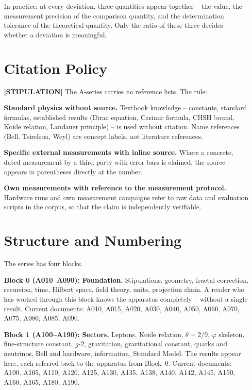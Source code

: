 In practice: at every deviation, three quantities appear together -- the
value, the measurement precision of the comparison quantity, and the
determination tolerance of the theoretical quantity. Only the ratio of these
three decides whether a deviation is meaningful.

\section{Citation Policy}

\textbf{[STIPULATION]} The A-series carries no reference lists. The rule:

\textbf{Standard physics without source.} Textbook knowledge -- constants,
standard formulas, established results (Dirac equation, Casimir formula,
CHSH bound, Koide relation, Landauer principle) -- is used without citation.
Name references (Bell, Tsirelson, Weyl) are concept labels, not literature
references.

\textbf{Specific external measurements with inline source.} Where a concrete,
dated measurement by a third party with error bars is claimed, the source
appears in parentheses directly at the number.

\textbf{Own measurements with reference to the measurement protocol.}
Hardware runs and own measurement campaigns refer to raw data and evaluation
scripts in the corpus, so that the claim is independently verifiable.

\section{Structure and Numbering}

The series has four blocks.

\textbf{Block 0 (A010--A090): Foundation.} Stipulations, geometry, fractal
correction, recursion, time, Hilbert space, field theory, units, projection
chain. A reader who has worked through this block knows the apparatus
completely -- without a single result. Current documents: A010, A015, A020,
A030, A040, A050, A060, A070, A075, A080, A085, A090.

\textbf{Block 1 (A100--A190): Sectors.} Leptons, Koide relation,
$\theta = 2/9$, $\varphi$ skeleton, fine-structure constant, $g$-2, gravitation, gravitational
constant, quarks and neutrinos, Bell and hardware, information, Standard
Model. The results appear here, each referred back to the apparatus from
Block~0. Current documents: A100, A105, A110, A120, A125, A130, A135, A138, A140,
A142, A145, A150, A160, A165, A180, A190.

